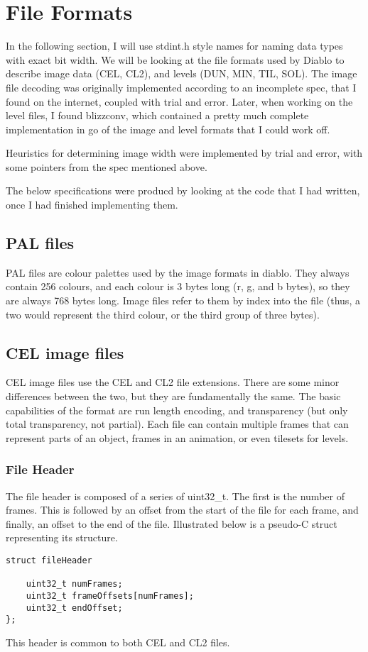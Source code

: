 \chapter{File Formats}
In the following section, I will use stdint.h style names for naming data types with exact bit width.
We will be looking at the file formats used by Diablo to describe image data (CEL, CL2), and levels (DUN, MIN, TIL, SOL).
The image file decoding was originally implemented according to an incomplete spec\cite{celspec}, that I found on the internet, coupled with trial and error. Later, when working on the level files, I found blizzconv\cite{blizzconv}, which contained a pretty much complete implementation in go of the image and level formats that I could work off.

Heuristics for determining image width were implemented by trial and error, with some pointers from the spec mentioned above.

The below specifications were producd by looking at the code that I had written, once I had finished implementing them.

\section{PAL files}
    PAL files are colour palettes used by the image formats in diablo. They always contain 256 colours, and each colour is 3 bytes long (r, g, and b bytes), so they are always 768 bytes long. Image files refer to them by index into the file (thus, a two would represent the third colour, or the third group of three bytes).

\section{CEL image files}
	CEL image files use the CEL and CL2 file extensions. There are some minor differences between the two, but they are fundamentally the same. The basic capabilities of the format are run length encoding, and transparency (but only total transparency, not partial). Each file can contain multiple frames that can represent parts of an object, frames in an animation, or even tilesets for levels.

	\subsection{File Header}
	\label{sec:fileheaders}
	The file header is composed of a series of uint32\_t. The first is the number of frames. This is followed by an offset from the start of the file for each frame, and finally, an offset to the end of the file. Illustrated below is a pseudo-C struct representing its structure.
	\begin{lstlisting}
struct fileHeader

	uint32_t numFrames;
	uint32_t frameOffsets[numFrames];
	uint32_t endOffset;
};
	\end{lstlisting}
	 This header is common to both CEL and CL2 files.
	 
